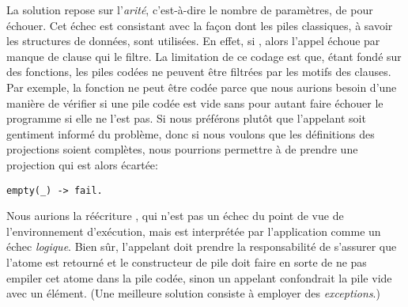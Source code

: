 La solution repose sur l'\emph{arité}, c'est-à-dire le nombre de
paramètres, de  pour échouer. Cet échec est
consistant avec la façon dont les piles classiques, à savoir les
structures de données, sont utilisées. En effet, si
, alors l'appel  échoue
par manque de clause qui le filtre. La limitation de ce codage est
que, étant fondé sur des fonctions, les piles codées ne peuvent être
filtrées par les motifs des clauses. Par exemple, la fonction
   ne
peut être codée parce que nous aurions besoin d'une manière de
vérifier si une pile codée est vide sans pour autant faire échouer le
programme si elle ne l'est pas. Si nous préférons plutôt que
l'appelant soit gentiment informé du problème, donc si nous voulons
que les définitions des projections soient complètes, nous pourrions
permettre à  de prendre une projection qui est alors
écartée:
\begin{verbatim}
empty(_) -> fail.
\end{verbatim}
Nous aurions la réécriture , qui n'est pas un échec du point de vue de l'environnement
d'exécution, mais est interprétée par l'application comme un échec
\emph{logique}. Bien sûr, l'appelant doit prendre la responsabilité de
s'assurer que l'atome  est retourné et le constructeur
de pile doit faire en sorte de ne pas empiler cet atome dans la pile
codée, sinon un appelant confondrait la pile vide avec un
élément. (Une meilleure solution consiste à employer des
\emph{exceptions}.)


